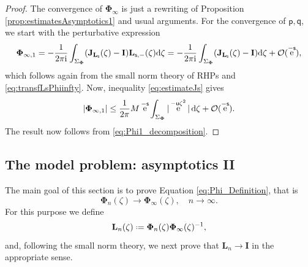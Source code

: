 \documentclass[reqno,a4paper,11pt]{amsart}
\DeclareMathOperator{\ee}{\rm e}
\newcommand{\Boh}{\mathcal{O}}
\newcommand{\ii}{\mathrm{i}}
\newcommand{\dd}{\mathrm{d}}
\renewcommand{\bm}{\mathbf}
\newcommand{\msf}{\mathsf}
\newcommand{\sad}{\msf s}
\newcommand{\uad}{\msf u}
\theoremstyle{definition}
\theoremstyle{remark}
\numberwithin{equation}{section}
\newcommand*{\defeq}{\mathrel{\vcenter{\baselineskip0.5ex \lineskiplimit0pt
                     \hbox{\scriptsize.}\hbox{\scriptsize.}}}%
                     =}
\begin{document}
    \begin{proof}
        The convergence of $\bm \Phi_\infty$ is just a rewriting of Proposition \ref{prop:estimatesAsymptotics1} and usual arguments. For the convergence of $\msf p,\msf q$, we start with the perturbative expression
        \begin{align*}
        \bm \Phi_{\infty,1} 
            =-\frac{1}{2\pi\ii}\int_{\Sigma_{\bm \Phi}}(\bm J_{\bm L_\sad}(\zeta)-\bm I)\bm L_{\sad,-}(\zeta)\dd \zeta
            =-\frac{1}{2\pi\ii}\int_{\Sigma_{\bm \Phi}}(\bm J_{\bm L_\sad}(\zeta)-\bm I)\dd \zeta+\Boh(\ee^{-\sad}),
        \end{align*}
        which follows again from the small norm theory of RHPs and \eqref{eq:transfLsPhiinfty}. Now, inequality \eqref{eq:estimateJs} gives
        \[
        |\bm \Phi_{\infty, 1}| 
            \leq \frac{1}{2 \pi} M \ee^{- \sad} \int_{\Sigma_{\bm \Phi}} | \ee^{- \uad \zeta^2} | \, \dd \zeta + \Boh(\ee^{- \sad}).
        \]
        The result now follows from \eqref{eq:Phi1_decomposition}.
    \end{proof}


\subsection{The model problem: asymptotics II}\label{sec:Asymptotics2}
\hfill 

The main goal of this section is to prove Equation \eqref{eq:Phi_Definition}, that is
%
\[
\bm \Phi_n(\zeta)\to \bm \Phi_\infty(\zeta),\quad n\to \infty.
\]
%
For this purpose we define
%
\[
    \bm L_n(\zeta) \defeq \bm \Phi_n(\zeta) \bm \Phi_\infty (\zeta)^{-1},
\]
%
and, following the small norm theory, we next prove that $\bm L_n\to \bm I$ in the appropriate sense.
\end{document}
